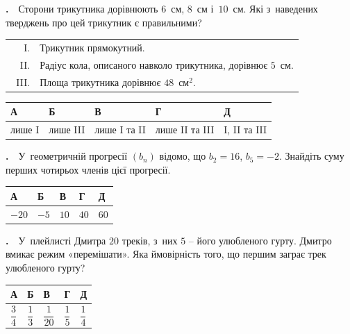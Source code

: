 \documentclass[12pt]{article}
\newlength{\nmtcellw}
\newcommand{\nmtSetCell}{\setlength{\nmtcellw}{\dimexpr(\linewidth-10\tabcolsep-6\arrayrulewidth)/5\relax}}
\newcommand{\answerTable}[5]{%
\par\nopagebreak\vspace{0.15cm}
\noindent\nmtSetCell
\begin{tabular}{|*{5}{>{\centering\arraybackslash}m{\nmtcellw}|}}
\hline
\rule[-0.15cm]{0pt}{0.6cm}\textbf{А} & \rule[-0.15cm]{0pt}{0.6cm}\textbf{Б} & \rule[-0.15cm]{0pt}{0.6cm}\textbf{В} & \rule[-0.15cm]{0pt}{0.6cm}\textbf{Г} & \rule[-0.15cm]{0pt}{0.6cm}\textbf{Д} \\
\hline
\rule[-0.2cm]{0pt}{0.75cm}#1 & \rule[-0.2cm]{0pt}{0.75cm}#2 & \rule[-0.2cm]{0pt}{0.75cm}#3 & \rule[-0.2cm]{0pt}{0.75cm}#4 & \rule[-0.2cm]{0pt}{0.75cm}#5 \\
\hline
\end{tabular}
\par\vspace{0.25cm}
}
\newcommand{\answerTableTall}[5]{%
\par\nopagebreak\vspace{0.15cm}
\noindent\nmtSetCell
\begin{tabular}{|*{5}{>{\centering\arraybackslash}m{\nmtcellw}|}}
\hline
\rule[-0.2cm]{0pt}{0.7cm}\textbf{А} & \rule[-0.2cm]{0pt}{0.7cm}\textbf{Б} & \rule[-0.2cm]{0pt}{0.7cm}\textbf{В} & \rule[-0.2cm]{0pt}{0.7cm}\textbf{Г} & \rule[-0.2cm]{0pt}{0.7cm}\textbf{Д} \\
\hline
\rule[-0.45cm]{0pt}{1.2cm}#1 & \rule[-0.45cm]{0pt}{1.2cm}#2 & \rule[-0.45cm]{0pt}{1.2cm}#3 & \rule[-0.45cm]{0pt}{1.2cm}#4 & \rule[-0.45cm]{0pt}{1.2cm}#5 \\
\hline
\end{tabular}
\par\vspace{0.25cm}
}
\newcounter{zad}
\newcommand{\zadtask}[1]{\stepcounter{zad}\noindent\textbf{\thezad.}\ \ #1\par\nopagebreak\vspace{0.2cm}}
\newcounter{ans}
\newcommand{\nbvspace}[1]{\nopagebreak\vspace{#1}}
\begin{document}
\begin{samepage}
\zadtask{Сторони трикутника дорівнюють $6$~см, $8$~см і~$10$~см. Які з~наведених тверджень про цей трикутник є правильними?\par\nopagebreak\nbvspace{0.1cm}\noindent\begin{tabular}{@{}r@{\ \ }p{0.9\linewidth}@{}}I. & Трикутник прямокутний. \\ II. & Радіус кола, описаного навколо трикутника, дорівнює $5$~см. \\III. & Площа трикутника дорівнює $48$~см$^2$.\end{tabular}}
\answerTable{лише I}{лише III}{лише I та II}{лише II та III}{I, II та III}
\par{}
\end{samepage}

\begin{samepage}
\zadtask{У~геометричній прогресії $(b_n)$ відомо, що $b_2=16$, $b_5=-2$. Знайдіть суму перших чотирьох членів цієї прогресії.}
\answerTable{$-20$}{$-5$}{$10$}{$40$}{$60$}
\par{}
\end{samepage}

\begin{samepage}
\zadtask{У~плейлисті Дмитра $20$ треків, з~них $5$ -- його улюбленого гурту. Дмитро вмикає режим «перемішати». Яка ймовірність того, що першим заграє трек улюбленого гурту?}
\answerTableTall{$\dfrac{3}{4}$}{$\dfrac{1}{3}$}{$\dfrac{1}{20}$}{$\dfrac{1}{5}$}{$\dfrac{1}{4}$}
\par{}
\end{samepage}
\end{document}
